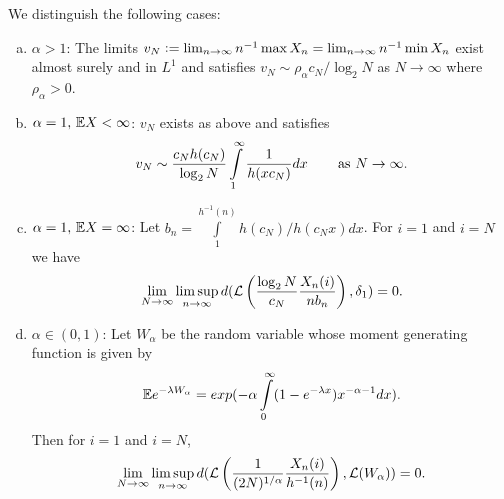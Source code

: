 \begin{theorem}\label{thm:poly_tails_result}
We distinguish the following cases:
\begin{enumerate}[(a)]

\item \vspace{-2mm} $\alpha > 1$: The limits $v_N \defeq \lim_{n \to \infty} n^{-1} \max X_n = \lim_{n \to \infty} n^{-1} \min X_n$ exist almost surely and in $L^1$ and satisfies $v_N \sim \rho_\alpha c_N / \log_2 N$ as $N \to \infty$ where $\rho_\alpha > 0$. \\

\item \vspace{-5mm} $\alpha = 1,\, \E X < \infty$: $v_N$ exists as above and satisfies 
\begin{equation}\nonumber
v_N \sim \frac{c_N h(c_N)}{\log_2 N} \int\limits^\infty_1 \frac{1}{h(x c_N)} dx \qquad\,\text{as }N \to \infty. \\
\end{equation}

\item \vspace{-5mm} $\alpha = 1,\, \E X = \infty$: Let $b_n = \int\limits^{h^{-1}(n)}_{1} h(c_N)/h(c_N x) dx$. For $i=1$ and $i=N$ we have
\begin{equation}\nonumber
\lim\limits_{N \to \infty} \limsup\limits_{n \to \infty} d(\cal{L}\left( \frac{\log_2 N}{c_N}\frac{X_n(i)}{n b_n}\right), \delta_1) = 0. 
\end{equation}

\item \vspace{-4mm} $\alpha \in (0, 1)$: Let $W_\alpha$ be the random variable whose moment generating function is given by
\begin{equation}\nonumber
\E e^{-\lambda W_\alpha} = exp(- \alpha \int\limits^\infty_0 (1 - e^{-\lambda x})x^{-\alpha - 1}dx). 
\end{equation}
Then for $i=1$ and $i=N$, 
\begin{equation}\nonumber
\lim\limits_{N \to \infty} \limsup\limits_{n \to \infty} d(\cal{L}\left( \frac{1}{(2N)^{1/\alpha}}\frac{X_n(i)}{h^{-1}(n)}\right), \cal{L}(W_\alpha)) = 0. 
\end{equation}
\end{enumerate}
\end{theorem}


